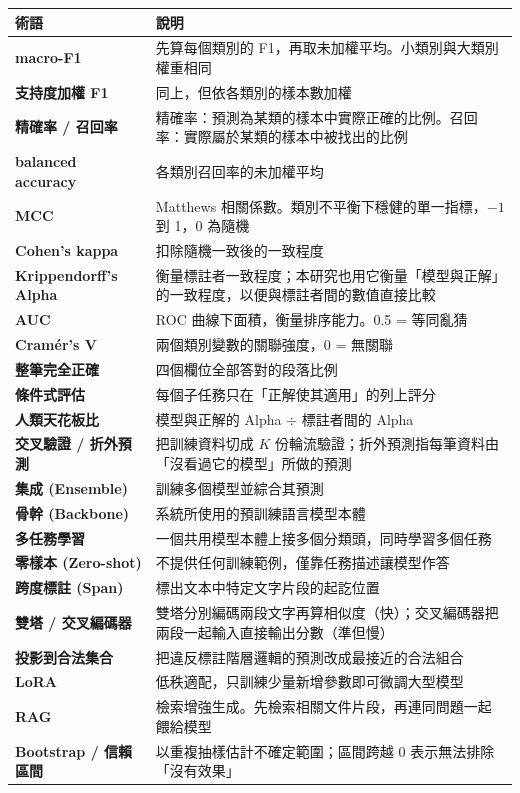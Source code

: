 \documentclass[11pt,a4paper]{ctexart}
\begin{document}
\begin{longtable}{@{}p{4.2cm}p{10.3cm}@{}}
\toprule
術語 & 說明 \\
\midrule
\endhead
\textbf{macro-F1} & 先算每個類別的 F1，再取未加權平均。小類別與大類別權重相同 \\
\textbf{支持度加權 F1} & 同上，但依各類別的樣本數加權 \\
\textbf{精確率 / 召回率} & 精確率：預測為某類的樣本中實際正確的比例。召回率：實際屬於某類的樣本中被找出的比例 \\
\textbf{balanced accuracy} & 各類別召回率的未加權平均 \\
\textbf{MCC} & Matthews 相關係數。類別不平衡下穩健的單一指標，$-1$ 到 1，0 為隨機 \\
\textbf{Cohen's kappa} & 扣除隨機一致後的一致程度 \\
\textbf{Krippendorff's Alpha} & 衡量標註者一致程度；本研究也用它衡量「模型與正解」的一致程度，以便與標註者間的數值直接比較 \\
\textbf{AUC} & ROC 曲線下面積，衡量排序能力。0.5 = 等同亂猜 \\
\textbf{Cramér's V} & 兩個類別變數的關聯強度，0 = 無關聯 \\
\textbf{整筆完全正確} & 四個欄位全部答對的段落比例 \\
\textbf{條件式評估} & 每個子任務只在「正解使其適用」的列上評分 \\
\textbf{人類天花板比} & 模型與正解的 Alpha $\div$ 標註者間的 Alpha \\
\textbf{交叉驗證 / 折外預測} & 把訓練資料切成 $K$ 份輪流驗證；折外預測指每筆資料由「沒看過它的模型」所做的預測 \\
\textbf{集成 (Ensemble)} & 訓練多個模型並綜合其預測 \\
\textbf{骨幹 (Backbone)} & 系統所使用的預訓練語言模型本體 \\
\textbf{多任務學習} & 一個共用模型本體上接多個分類頭，同時學習多個任務 \\
\textbf{零樣本 (Zero-shot)} & 不提供任何訓練範例，僅靠任務描述讓模型作答 \\
\textbf{跨度標註 (Span)} & 標出文本中特定文字片段的起訖位置 \\
\textbf{雙塔 / 交叉編碼器} & 雙塔分別編碼兩段文字再算相似度（快）；交叉編碼器把兩段一起輸入直接輸出分數（準但慢） \\
\textbf{投影到合法集合} & 把違反標註階層邏輯的預測改成最接近的合法組合 \\
\textbf{LoRA} & 低秩適配，只訓練少量新增參數即可微調大型模型 \\
\textbf{RAG} & 檢索增強生成。先檢索相關文件片段，再連同問題一起餵給模型 \\
\textbf{Bootstrap / 信賴區間} & 以重複抽樣估計不確定範圍；區間跨越 0 表示無法排除「沒有效果」 \\
\bottomrule
\end{longtable}
\end{document}
